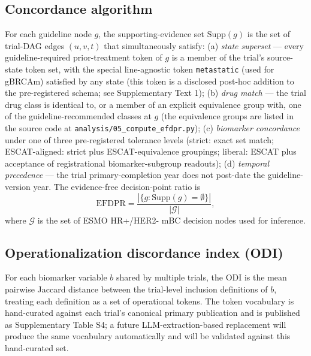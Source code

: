 \documentclass[11pt,a4paper]{article}
\begin{document}
\subsection{Concordance algorithm}
For each guideline node $g$, the supporting-evidence set $\mathrm{Supp}(g)$ is the set of trial-DAG edges $(u, v, t)$ that simultaneously satisfy: (a) \emph{state superset} --- every guideline-required prior-treatment token of $g$ is a member of the trial's source-state token set, with the special line-agnostic token \texttt{metastatic} (used for gBRCAm) satisfied by any state (this token is a disclosed post-hoc addition to the pre-registered schema; see Supplementary Text 1); (b) \emph{drug match} --- the trial drug class is identical to, or a member of an explicit equivalence group with, one of the guideline-recommended classes at $g$ (the equivalence groups are listed in the source code at \texttt{analysis/05\_compute\_efdpr.py}); (c) \emph{biomarker concordance} under one of three pre-registered tolerance levels (strict: exact set match; ESCAT-aligned: strict plus ESCAT-equivalence groupings; liberal: ESCAT plus acceptance of registrational biomarker-subgroup readouts); (d) \emph{temporal precedence} --- the trial primary-completion year does not post-date the guideline-version year. The evidence-free decision-point ratio is
\[
\mathrm{EFDPR} = \frac{|\{ g : \mathrm{Supp}(g) = \emptyset \}|}{|\mathcal{G}|},
\]
where $\mathcal{G}$ is the set of ESMO HR+/HER2- mBC decision nodes used for inference.

\subsection{Operationalization discordance index (ODI)}
For each biomarker variable $b$ shared by multiple trials, the ODI is the mean pairwise Jaccard distance between the trial-level inclusion definitions of $b$, treating each definition as a set of operational tokens. The token vocabulary is hand-curated against each trial's canonical primary publication and is published as Supplementary Table S4; a future LLM-extraction-based replacement will produce the same vocabulary automatically and will be validated against this hand-curated set.
\end{document}
